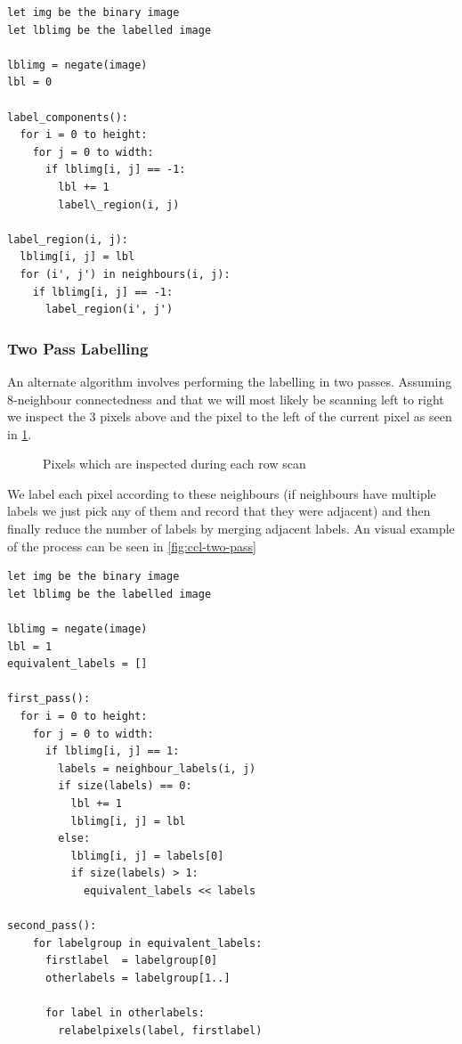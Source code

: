 \begin{lstlisting}[caption=Recursive Connected Component Labelling (DFS), label=alg:ccl-recursive]
let img be the binary image
let lblimg be the labelled image

lblimg = negate(image)
lbl = 0

label_components():
  for i = 0 to height:
    for j = 0 to width:
      if lblimg[i, j] == -1:
        lbl += 1
        label\_region(i, j)

label_region(i, j):
  lblimg[i, j] = lbl
  for (i', j') in neighbours(i, j):
    if lblimg[i, j] == -1:
      label_region(i', j')
\end{lstlisting}

\subsubsection{Two Pass Labelling}

An alternate algorithm involves performing the labelling in two passes. Assuming 8-neighbour connectedness and that we will most likely be scanning left to right we inspect the 3 pixels above and the pixel to the left of the current pixel as seen in \cref{fig:scan-neighbours}.

\begin{figure}[h!]
  \centering
  
  \caption{Pixels which are inspected during each row scan}
  \label{fig:scan-neighbours}
\end{figure}

We label each pixel according to these neighbours (if neighbours have multiple labels we just pick any of them and record that they were adjacent) and then finally reduce the number of labels by merging adjacent labels. An visual example of the process can be seen in \cref{fig:ccl-two-pass}

\begin{lstlisting}[caption=Iterative Two-Pass Connected Component Labelling, label=alg:ccl-iterative]
let img be the binary image
let lblimg be the labelled image

lblimg = negate(image)
lbl = 1
equivalent_labels = []

first_pass():
  for i = 0 to height:
    for j = 0 to width:
      if lblimg[i, j] == 1:
        labels = neighbour_labels(i, j)
        if size(labels) == 0:
          lbl += 1
          lblimg[i, j] = lbl
        else:
          lblimg[i, j] = labels[0]
          if size(labels) > 1:
            equivalent_labels << labels

second_pass():
    for labelgroup in equivalent_labels:
      firstlabel  = labelgroup[0]
      otherlabels = labelgroup[1..]

      for label in otherlabels:
        relabelpixels(label, firstlabel)
\end{lstlisting}

